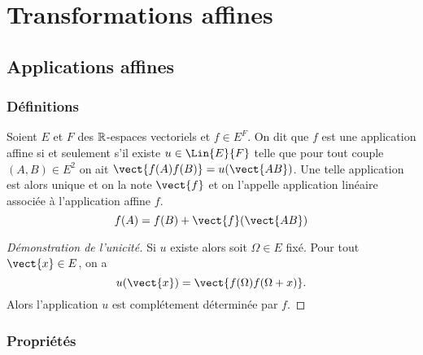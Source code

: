 \chapter{Transformations affines}
\label{chap:transformationsaffines}
\minitoc
\minilof
\minilot

\section{Applications affines}

\subsection{Définitions}

Soient $E$ et $F$ des $\mathbb{R}$-espaces vectoriels et $f\in E^F$. On dit que $f$ est une application affine si et seulement s'il existe $u \in \Lin{E}{F}$ telle que pour tout couple $(A,B) \in E^2$ on ait $\vect{f(A)f(B)}=u(\vect{AB})$. Une telle application est alors unique et on la note $\vect{f}$ et on l'appelle application linéaire associée à l'application affine $f$.
\begin{equation}
  f(A)=f(B)+ \vect{f}(\vect{AB})
\end{equation}
\begin{proof}[Démonstration de l'unicité]
  Si $u$ existe alors soit $\Omega \in E$ fixé. Pour tout $\vect{x} \in E$, on a
  \begin{equation}
    u(\vect{x})=\vect{f(\Omega)f(\Omega+x)}.
  \end{equation}
  Alors l'application $u$ est complétement déterminée par $f$.
\end{proof}

\subsection{Propriétés}

